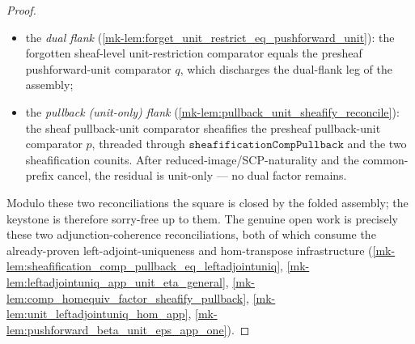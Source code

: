 \begin{proof}
  \begin{itemize}
    \item the \emph{dual flank} (\ref{mk-lem:forget_unit_restrict_eq_pushforward_unit}): the
      forgotten sheaf-level unit-restriction comparator equals the presheaf pushforward-unit
      comparator \(q\), which discharges the dual-flank leg of the assembly;
    \item the \emph{pullback (unit-only) flank} (\ref{mk-lem:pullback_unit_sheafify_reconcile}): the
      sheaf pullback-unit comparator sheafifies the presheaf pullback-unit comparator \(p\), threaded
      through \(\mathtt{sheafificationCompPullback}\) and the two sheafification counits. After
      reduced-image/SCP-naturality and the common-prefix cancel, the residual is unit-only --- no
      dual factor remains.
  \end{itemize}

  Modulo these two reconciliations the square is closed by the folded assembly; the keystone is
  therefore sorry-free up to them. The genuine open work is precisely these two adjunction-coherence
  reconciliations, both of which consume the already-proven left-adjoint-uniqueness and
  hom-transpose infrastructure (\ref{mk-lem:sheafification_comp_pullback_eq_leftadjointuniq},
  \ref{mk-lem:leftadjointuniq_app_unit_eta_general}, \ref{mk-lem:comp_homequiv_factor_sheafify_pullback},
  \ref{mk-lem:unit_leftadjointuniq_hom_app}, \ref{mk-lem:pushforward_beta_unit_eps_app_one}).
\end{proof}

